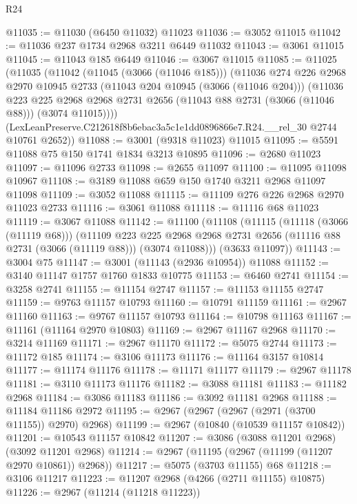\begin{lexlean}{R24}
\begin{coremodule}
@11035 := @11030 (@6450 @11032) @11023
@11036 := @3052 @11015
@11042 := @11036 @237 @1734 @2968 @3211 @6449 @11032
@11043 := @3061 @11015
@11045 := @11043 @185 @6449
@11046 := @3067 @11015
@11085 := @11025
    (@11035
      (@11042
        (@11045 (@3066 (@11046 @185)))
        (@11036
          @274
          @226
          @2968
          @2970
          @10945
          @2733
          (@11043 @204 @10945 (@3066 (@11046 @204)))
          (@11036
            @223
            @225
            @2968
            @2968
            @2731
            @2656
            (@11043 @88 @2731 (@3066 (@11046 @88)))
            (@3074 @11015))))
      (LexLeanPreserve.C212618f8b6ebac3a5c1e1dd0896866e7.R24.__rel_30 @2744 @10761 @2652))
@11088 := @3001 (@9318 @11023) @11015
@11095 := @5591 @11088 @75 @150 @1741 @1834 @3213 @10895
@11096 := @2680 @11023
@11097 := @11096 @2733
@11098 := @2655 @11097
@11100 := @11095 @11098 @10967
@11108 := @3189 @11088 @659 @150 @1740 @3211 @2968 @11097 @11098
@11109 := @3052 @11088
@11115 := @11109 @276 @226 @2968 @2970 @11023 @2733
@11116 := @3061 @11088
@11118 := @11116 @68 @11023
@11119 := @3067 @11088
@11142 := @11100
    (@11108
      (@11115
        (@11118 (@3066 (@11119 @68)))
        (@11109
          @223
          @225
          @2968
          @2968
          @2731
          @2656
          (@11116 @88 @2731 (@3066 (@11119 @88)))
          (@3074 @11088)))
      (@3633 @11097))
@11143 := @3004 @75
@11147 := @3001 (@11143 (@2936 @10954)) @11088
@11152 := @3140 @11147 @1757 @1760 @1833 @10775
@11153 := @6460 @2741
@11154 := @3258 @2741
@11155 := @11154 @2747
@11157 := @11153 @11155 @2747
@11159 := @9763 @11157 @10793
@11160 := @10791 @11159
@11161 := @2967 @11160
@11163 := @9767 @11157 @10793
@11164 := @10798 @11163
@11167 := @11161 (@11164 @2970 @10803)
@11169 := @2967 @11167 @2968
@11170 := @3214 @11169
@11171 := @2967 @11170
@11172 := @5075 @2744
@11173 := @11172 @185
@11174 := @3106 @11173
@11176 := @11164 @3157 @10814
@11177 := @11174 @11176
@11178 := @11171 @11177
@11179 := @2967 @11178
@11181 := @3110 @11173 @11176
@11182 := @3088 @11181
@11183 := @11182 @2968
@11184 := @3086 @11183
@11186 := @3092 @11181 @2968
@11188 := @11184 @11186 @2972
@11195 := @2967 (@2967 (@2967 (@2971 (@3700 @11155)) @2970) @2968)
@11199 := @2967 (@10840 (@10539 @11157 @10842))
@11201 := @10543 @11157 @10842
@11207 := @3086 (@3088 @11201 @2968) (@3092 @11201 @2968)
@11214 := @2967 (@11195 (@2967 (@11199 (@11207 @2970 @10861)) @2968))
@11217 := @5075 (@3703 @11155) @68
@11218 := @3106 @11217
@11223 := @11207 @2968 (@4266 (@2711 @11155) @10875)
@11226 := @2967 (@11214 (@11218 @11223))

\end{coremodule}
\end{lexlean}
